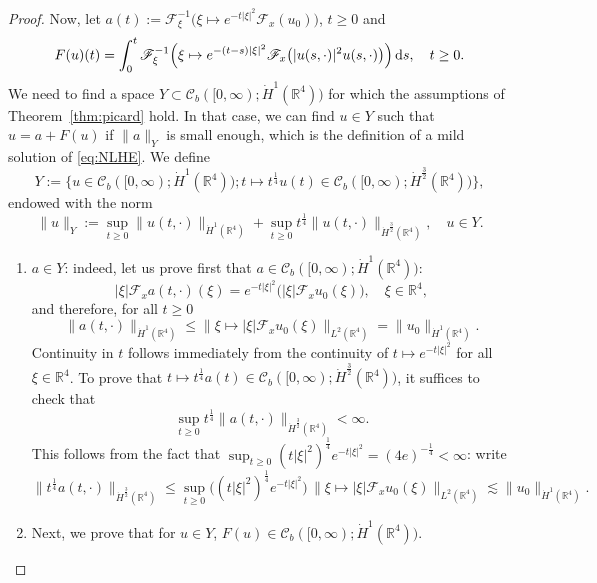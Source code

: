 \documentclass[a4paper, 12pt]{article}
\theoremstyle{plain}
\theoremstyle{definition}
\theoremstyle{remark}
\numberwithin{equation}{section}
\begin{document}
\begin{proof}
\noindent
Now, let $a(t):={\mathscr{F}}_\xi^{-1}\bigl(\xi\mapsto e^{-t|\xi|^2}{\mathscr{F}}_x(u_0)\bigr)$, $t\ge 0$ and
%
\begin{equation}
\label{eq:defF(u)}
F(u)(t)=\int_0^t {\mathscr{F}}_\xi^{-1}\Bigl(\xi \mapsto e^{-(t-s)|\xi|^2}{\mathscr{F}}_x\bigl(|u(s,\cdot)|^2 u(s,\cdot)\bigr)\Bigr)\,{\rm d}s, \quad
t\ge0.
\end{equation}
%
We need to find a space $Y\subset {\mathscr{C}}_b([0,\infty);\dot H^1({\mathds{R}}^4))$ for which 
the assumptions of Theorem~\ref{thm:picard} hold. In that case, we can find $u\in Y$ such that $u=a+F(u)$ if $\|a\|_Y$ 
is small enough, which is the definition of a mild solution of \eqref{eq:NLHE}. We define
%
\begin{equation}
\label{eq:Y}
Y:=\bigl\{u\in {\mathscr{C}}_b([0,\infty);\dot H^1({\mathds{R}}^4)); 
t\mapsto t^{\frac{1}{4}}u(t)\in {\mathscr{C}}_b([0,\infty);\dot H^{\frac{3}{2}}({\mathds{R}}^4))\bigr\},
\end{equation}
%
endowed with the norm
\[
\|u\|_Y:=\sup_{t\ge 0}\bigl\|u(t,\cdot)\bigr\|_{\dot H^1({\mathds{R}}^4)} +
\sup_{t\ge 0} t^{\frac{1}{4}}\bigl\|u(t,\cdot)\bigr\|_{\dot H^{\frac{3}{2}}({\mathds{R}}^4)}, \quad u\in Y.
\]
\begin{enumerate}
\item
$a\in Y$: indeed, let us prove first that $a\in {\mathscr{C}}_b([0,\infty);\dot H^1({\mathds{R}}^4))$: 
\[
|\xi| {\mathscr{F}}_xa(t,\cdot)(\xi)= e^{-t|\xi|^2}\bigl(|\xi|{\mathscr{F}}_xu_0(\xi)\bigr), \quad \xi \in {\mathds{R}}^4,
\] 
and therefore, for all $t\ge 0$
\[
\bigl\|a(t,\cdot)\bigr\|_{\dot H^1({\mathds{R}}^4)}\le \bigl\|\xi\mapsto |\xi|{\mathscr{F}}_xu_0(\xi)\bigr\|_{L^2({\mathds{R}}^4)}
=\|u_0\|_{\dot H^1({\mathds{R}}^4)}.
\]
Continuity in $t$ follows immediately from the continuity of $t\mapsto e^{-t|\xi|^2}$ for all $\xi \in {\mathds{R}}^4$.
To prove that $t\mapsto t^{\frac{1}{4}}a(t)\in {\mathscr{C}}_b([0,\infty);\dot H^{\frac{3}{2}}({\mathds{R}}^4))$, it suffices
to check that 
\[
\sup_{t\ge 0} t^{\frac{1}{4}}\bigl\|a(t,\cdot)\bigr\|_{\dot H^{\frac{3}{2}}({\mathds{R}}^4)}<\infty.
\]
This follows from the fact that $\sup_{t\ge 0} (t|\xi|^2)^{\frac{1}{4}}e^{-t|\xi|^2}=(4e)^{-\frac{1}{4}}<\infty$: write
\[
\bigl\|t^{\frac{1}{4}}a(t,\cdot)\bigr\|_{\dot H^{\frac{3}{2}}({\mathds{R}}^4)}\le \sup_{t\ge 0} \bigl((t|\xi|^2)^{\frac{1}{4}}e^{-t|\xi|^2}\bigr)\,
\bigl\|\xi\mapsto |\xi|{\mathscr{F}}_xu_0(\xi)\bigr\|_{L^2({\mathds{R}}^4)}
\lesssim \|u_0\|_{\dot H^1({\mathds{R}}^4)}.
\]
\item
Next, we prove that for $u\in Y$, $F(u)\in {\mathscr{C}}_b([0,\infty);\dot H^1({\mathds{R}}^4))$.

\end{enumerate}
\end{proof}
\end{document}
